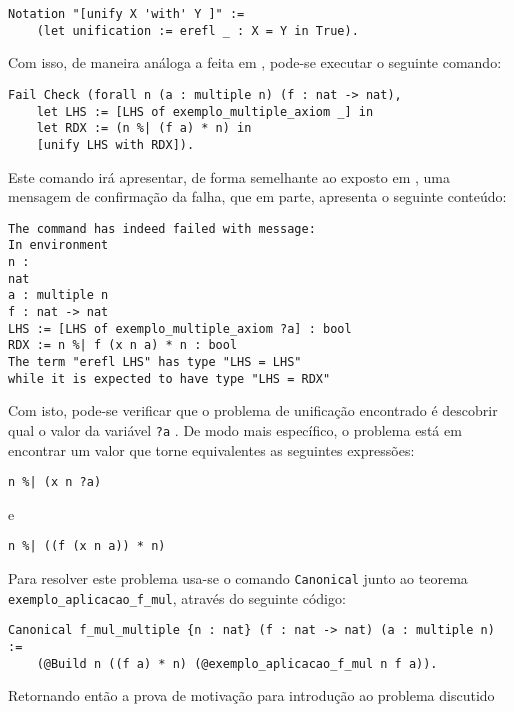 {{\begin{lstlisting}[language = coq,frame=single,tabsize=1]
Notation "[unify X 'with' Y ]" := 
    (let unification := erefl _ : X = Y in True).
    \end{lstlisting} 
Com isso, de maneira análoga a feita em \cite{assia_mahboubi_2022_7118596}, pode-se executar o seguinte comando:
    \begin{lstlisting}[language = coq,frame=single,tabsize=1]
Fail Check (forall n (a : multiple n) (f : nat -> nat),
    let LHS := [LHS of exemplo_multiple_axiom _] in
    let RDX := (n %| (f a) * n) in
    [unify LHS with RDX]).
    \end{lstlisting}
Este comando irá apresentar, de forma semelhante ao exposto em \cite{assia_mahboubi_2022_7118596}, uma mensagem de confirmação da falha, que em parte, apresenta o seguinte conteúdo:
    \begin{lstlisting}[language = coq-error,frame=single,tabsize=1]
The command has indeed failed with message:
In environment
n :
nat
a : multiple n
f : nat -> nat
LHS := [LHS of exemplo_multiple_axiom ?a] : bool
RDX := n %| f (x n a) * n : bool
The term "erefl LHS" has type "LHS = LHS"
while it is expected to have type "LHS = RDX"
    \end{lstlisting} 
Com isto, pode-se verificar que o problema de unificação encontrado é descobrir qual o valor da variável \lstinline[language = coq]!?a! \cite{assia_mahboubi_2022_7118596}. De modo mais específico, o problema está em encontrar um valor que torne equivalentes as seguintes expressões:
    \begin{lstlisting}[language = coq,frame=single,tabsize=1]
n %| (x n ?a)
    \end{lstlisting} 
e
    \begin{lstlisting}[language = coq,frame=single,tabsize=1]
n %| ((f (x n a)) * n)
    \end{lstlisting}
 Para resolver este problema %
 usa-se o comando \lstinline[language = coq]!Canonical! junto ao teorema\\ 
 \lstinline[language = coq]!exemplo_aplicacao_f_mul!, através do seguinte código:
    \begin{lstlisting}[language = coq,frame=single,tabsize=1]
Canonical f_mul_multiple {n : nat} (f : nat -> nat) (a : multiple n) := 
    (@Build n ((f a) * n) (@exemplo_aplicacao_f_mul n f a)).
    \end{lstlisting} 
    Retornando então a prova de motivação para introdução ao problema discutido\\
}}
